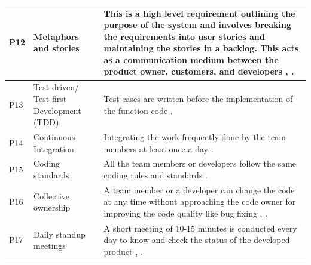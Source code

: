 \documentclass[a4paper,oneside]{bth}
\begin{document}
\begin{longtable}{|l|p{4cm}|p{8cm}|}
P12 & Metaphors and stories & This is a high level requirement outlining the purpose of the system and involves breaking the requirements into user stories and maintaining the stories in a backlog. This acts as a communication medium between the product owner, customers, and developers \cite{nawrocki_toward_2001}, \cite{martin_agile_2003}.\\ \hline
P13 & Test driven/ Test first Development (TDD) & Test cases are written before the implementation of the function code \cite{wang_assimilation_2012}.\\ \hline
P14 & Continuous Integration & Integrating the work frequently done by the team members at least once a day \cite{wang_assimilation_2012}.\\ \hline
P15 & Coding standards & All the team members or developers follow the same coding rules and standards \cite{nawrocki_toward_2001}.\\ \hline
P16 & Collective ownership & A team member or a developer can change the code at any time without approaching the code owner for improving the code quality like bug fixing \cite{williams_agile_2010}, \cite{nawrocki_toward_2001}.\\ \hline
P17 & Daily standup meetings & A short meeting of 10-15 minutes is conducted every day to know and check the status of the developed product \cite{wang_assimilation_2012}, \cite{williams_agile_2010}.\\ \hline

\end{longtable}
\end{document}
